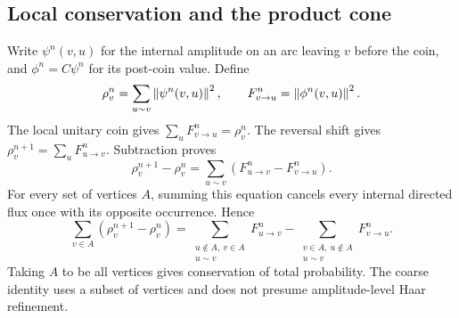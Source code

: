 \subsection{Local conservation and the product cone}

Write $\psi^n(v,u)$ for the internal amplitude on an arc leaving $v$
before the coin, and $\phi^n=C\psi^n$ for its post-coin value. Define
\[
 \rho_v^n=\sum_{u\sim v}\left\lVert\psi^n(v,u)\right\rVert^2,
 \qquad F_{v\to u}^n=\left\lVert\phi^n(v,u)\right\rVert^2.
\]
The local unitary coin gives
$\sum_uF_{v\to u}^n=\rho_v^n$.
The reversal shift gives
$\rho_v^{n+1}=\sum_u F_{u\to v}^n$. Subtraction proves
\begin{equation}
 \rho_v^{n+1}-\rho_v^n
 =\sum_{u\sim v}(F_{u\to v}^n-F_{v\to u}^n).
 \label{a-limit-walk-continuity}
\end{equation}
For every set of vertices $A$, summing this equation cancels every
internal directed flux once with its opposite occurrence. Hence
\begin{equation}
 \sum_{v\in A}(\rho_v^{n+1}-\rho_v^n)
 =\sum_{\substack{u\notin A,\ v\in A\\u\sim v}}F_{u\to v}^n
 -\sum_{\substack{v\in A,\ u\notin A\\u\sim v}}F_{v\to u}^n.
 \label{a-limit-walk-coarse-balance}
\end{equation}
Taking $A$ to be all vertices gives conservation of total probability.
The coarse identity uses a subset of vertices and does not presume
amplitude-level Haar refinement.

